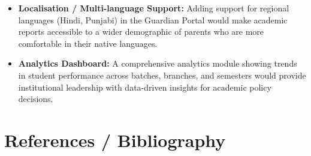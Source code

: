 \documentclass[12pt,a4paper]{report}
\begin{document}
\begin{itemize}
  \item \textbf{Localisation / Multi-language Support:} Adding support for regional languages (Hindi, Punjabi) in the Guardian Portal would make academic reports accessible to a wider demographic of parents who are more comfortable in their native languages.

  \item \textbf{Analytics Dashboard:} A comprehensive analytics module showing trends in student performance across batches, branches, and semesters would provide institutional leadership with data-driven insights for academic policy decisions.
\end{itemize}

\chapter*{References / Bibliography}
\end{document}

